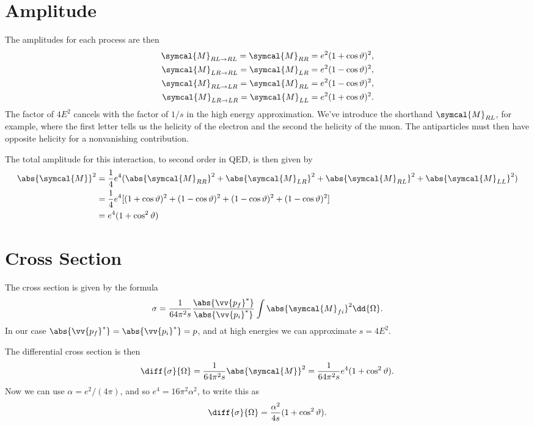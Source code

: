 \documentclass[fleqn]{NotesClass}
\newcommand{\amplitude}{\symcal{M}}
\begin{document}
    \section{Amplitude}
    The amplitudes for each process are then
    \begin{align}
        \amplitude_{RL \to RL} = \amplitude_{RR} = e^2(1 + \cos\vartheta)^2,\\
        \amplitude_{LR \to RL} = \amplitude_{LR} = e^2(1 - \cos\vartheta)^2,\\
        \amplitude_{RL \to LR} = \amplitude_{RL} = e^2(1 - \cos\vartheta)^2,\\
        \amplitude_{LR \to LR} = \amplitude_{LL} = e^2(1 + \cos\vartheta)^2.
    \end{align}
    The factor of \(4E^2\) cancels with the factor of \(1/s\) in the high energy approximation.
    We've introduce the shorthand \(\amplitude_{RL}\), for example, where the first letter tells us the helicity of the electron and the second the helicity of the muon.
    The antiparticles must then have opposite helicity for a nonvanishing contribution.
    
    The total amplitude for this interaction, to second order in QED, is then given by
    \begin{align}
        \abs{\amplitude}^2 &= \frac{1}{4}e^4(\abs{\amplitude_{RR}}^2 + \abs{\amplitude_{LR}}^2 + \abs{\amplitude_{RL}}^2 + \abs{\amplitude_{LL}}^2)\\
        &= \frac{1}{4} e^4[(1 + \cos\vartheta)^2 + (1 - \cos\vartheta)^2 + (1 - \cos\vartheta)^2 + (1 - \cos\vartheta)^2] \notag\\
        &= e^4(1 + \cos^2\vartheta)
    \end{align}
    
    \section{Cross Section}
    The cross section is given by the formula
    \begin{equation}
        \sigma = \frac{1}{64\pi^2 s} \frac{\abs{\vv{p_f}^*}}{\abs{\vv{p_i}^*}} \int \abs{\amplitude_{fi}}^2 \dd{\Omega}.
    \end{equation}
    In our case \(\abs{\vv{p_f}^*} = \abs{\vv{p_i}^*} = p\), and at high energies we can approximate \(s = 4E^2\).
    
    The differential cross section is then
    \begin{equation}
        \diff{\sigma}{\Omega} = \frac{1}{64\pi^2 s} \abs{\amplitude}^2 = \frac{1}{64\pi^2 s} e^4 (1 + \cos^2\vartheta).
    \end{equation}
    Now we can use \(\alpha = e^2/(4\pi)\), and so \(e^4 = 16\pi^2\alpha^2\), to write this as
    \begin{equation}
        \diff{\sigma}{\Omega} = \frac{\alpha^2}{4 s} (1 + \cos^2\vartheta).
    \end{equation}
    
\end{document}
